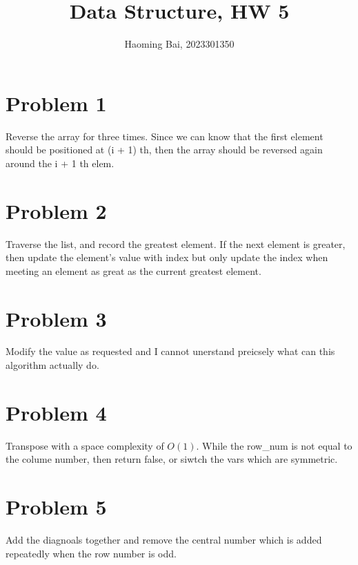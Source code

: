 \documentclass{article}
\title{Data Structure, HW 5}
\author{Haoming Bai, 2023301350}
\begin{document}
\maketitle
\section*{Problem 1}
Reverse the array for three times. Since we can know that the first element should be positioned at (i + 1) th, then the array should be reversed again around the i + 1 th elem.



\section*{Problem 2}
Traverse the list, and record the greatest element. If the next element is greater, then update the element's value with index but only update the index when meeting an element as great as the current greatest element.



\section*{Problem 3}
Modify the value as requested and I cannot unerstand preicsely what can this algorithm actually do.



\section*{Problem 4}
Transpose with a space complexity of $O(1)$. While the row\_num is not equal to the colume number, then return false, or siwtch the vars which are symmetric.



\section*{Problem 5}
Add the diagnoals together and remove the central number which is added repeatedly when the row number is odd.


\end{document}
